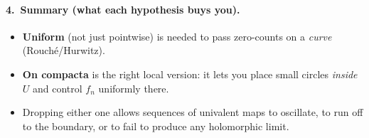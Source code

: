 \documentclass[12pt,a4paper]{article}
\begin{document}
\paragraph{4.\ Summary (what each hypothesis buys you).}
\begin{itemize}
	\item \textbf{Uniform} (not just pointwise) is needed to pass zero-counts on a \emph{curve} (Rouché/Hurwitz).
	\item \textbf{On compacta} is the right local version: it lets you place small circles \emph{inside} $U$ and control $f_n$ uniformly there.
	\item Dropping either one allows sequences of univalent maps to oscillate, to run off to the boundary, or to fail to produce any holomorphic limit.
\end{itemize}

	
	
\end{document}
